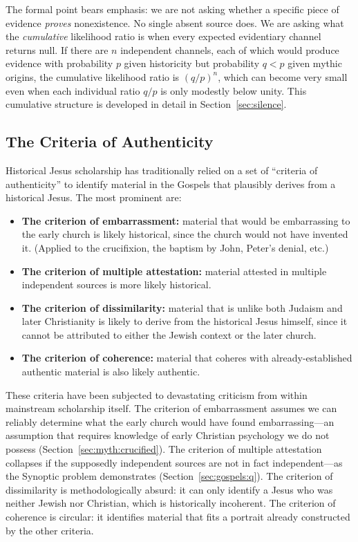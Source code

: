 \documentclass[12pt,oneside]{article}
\begin{document}
The formal point bears emphasis: we are not asking whether a specific
piece of evidence \textit{proves} nonexistence.  No single absent
source does.  We are asking what the \textit{cumulative} likelihood
ratio is when every expected evidentiary channel returns null.  If there
are $n$ independent channels, each of which would produce evidence with
probability $p$ given historicity but probability $q < p$ given
mythic origins, the cumulative likelihood ratio is $(q/p)^n$, which
can become very small even when each individual ratio $q/p$ is only
modestly below unity.  This cumulative structure is developed in detail
in Section~\ref{sec:silence}.

\subsection{The Criteria of Authenticity}
\label{sec:method:criteria}

Historical Jesus scholarship has traditionally relied on a set of
``criteria of authenticity'' to identify material in the Gospels that
plausibly derives from a historical Jesus.  The most prominent are:

\begin{itemize}[leftmargin=2em]
\item \textbf{The criterion of embarrassment:} material that would be
embarrassing to the early church is likely historical, since the church
would not have invented it.  (Applied to the crucifixion, the baptism
by John, Peter's denial, etc.)

\item \textbf{The criterion of multiple attestation:} material attested
in multiple independent sources is more likely historical.

\item \textbf{The criterion of dissimilarity:} material that is
unlike both Judaism and later Christianity is likely to derive from the
historical Jesus himself, since it cannot be attributed to either the
Jewish context or the later church.

\item \textbf{The criterion of coherence:} material that coheres with
already-established authentic material is also likely authentic.
\end{itemize}

These criteria have been subjected to devastating criticism from within
mainstream scholarship itself.  The criterion of embarrassment assumes
we can reliably determine what the early church would have found
embarrassing---an assumption that requires knowledge of early Christian
psychology we do not possess (Section~\ref{sec:myth:crucified}).  The
criterion of multiple attestation collapses if the supposedly
independent sources are not in fact independent---as the Synoptic
problem demonstrates (Section~\ref{sec:gospels:q}).  The criterion of
dissimilarity is methodologically absurd: it can only identify a Jesus
who was neither Jewish nor Christian, which is historically incoherent.
The criterion of coherence is circular: it identifies material that
fits a portrait already constructed by the other criteria.
\end{document}
